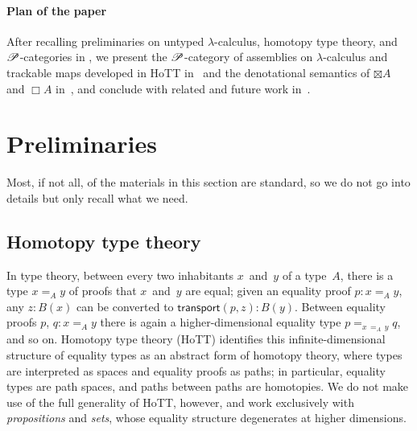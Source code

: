 \documentclass[a4paper,UKenglish,numberwithinsect,cleveref,thm-restate]{lipics-v2021}
\numberwithin{equation}{section}
\theoremstyle{definition}
\theoremstyle{plain}
\begin{document}

\paragraph*{Plan of the paper}
After recalling preliminaries on untyped $\lambda$-calculus, homotopy type theory, and $\mathscr{P}$-categories in , we present the $\mathscr{P}$-category of assemblies on $\lambda$-calculus and trackable maps developed in HoTT in~ and the denotational semantics of $\boxtimes A$ and $\Box A$ in~, and conclude with related and future work in~.

\section{Preliminaries}\label{sec:preliminaries}

Most, if not all, of the materials in this section are standard, so we do not go into details but only recall what we need.

\subsection{Homotopy type theory}

In type theory, between every two inhabitants $x$~and~$y$ of a type~$A$, there is a type $x =_A y$ of proofs that $x$~and~$y$ are equal; given an equality proof $p : x =_A y$, any $z : B(x)$ can be converted to $\mathsf{transport}(p, z) : B(y)$.
Between equality proofs $p$, $q : x =_A y$ there is again a higher-dimensional equality type $p =_{x\,{=_A}\,y} q$, and so on.
Homotopy type theory (HoTT) identifies this infinite-dimensional structure of equality types as an abstract form of homotopy theory, where types are interpreted as spaces and equality proofs as paths; in particular, equality types are path spaces, and paths between paths are homotopies.
We do not make use of the full generality of HoTT, however, and work exclusively with \emph{propositions} and \emph{sets}, whose equality structure degenerates at higher dimensions.
\end{document}
